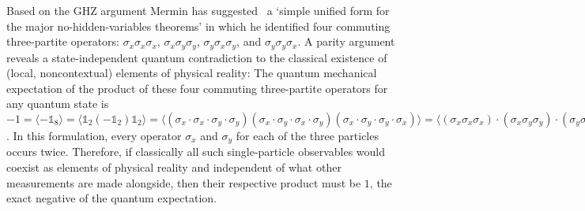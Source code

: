 \documentclass[
  twocolumn,
 showpacs,
 showkeys,
 preprintnumbers,
 amsmath,amssymb,
 aps,
 pra,
  longbibliography,
 floatfix,
 ]{revtex4-2}
\newcommand\myotimes{ }
\begin{document}
Based on the GHZ argument Mermin has suggested~\cite{mermin,mermin90b} a `simple unified form for the major no-hidden-variables theorems' in which he identified four commuting three-partite operators:
$\sigma_x \myotimes  \sigma_x \myotimes  \sigma_x$, $\sigma_x \myotimes  \sigma_y \myotimes  \sigma_y$, $\sigma_y \myotimes  \sigma_x \myotimes  \sigma_y$, and $\sigma_y \myotimes  \sigma_y \myotimes  \sigma_x$.
A parity argument reveals a state-independent quantum contradiction to the classical existence of (local, noncontextual) elements of physical reality:
The quantum mechanical expectation of the product of these four commuting three-partite operators for any quantum state is
$
-1= \langle
-\mathbb{1}_8
 \rangle
=
\langle
\mathbb{1}_2
\myotimes
(
-\mathbb{1}_2
)
\myotimes
\mathbb{1}_2
 \rangle
=
\langle
(
\sigma_x  \cdot \sigma_x  \cdot \sigma_y   \cdot \sigma_y
)
\myotimes
(
\sigma_x   \cdot \sigma_y   \cdot \sigma_x   \cdot  \sigma_y
)
\myotimes
(
\sigma_x   \cdot \sigma_y    \cdot \sigma_y    \cdot \sigma_x
) \rangle
=
\langle  (\sigma_x \myotimes  \sigma_x \myotimes  \sigma_x) \cdot (\sigma_x \myotimes  \sigma_y \myotimes  \sigma_y) \cdot (\sigma_y \myotimes  \sigma_x \myotimes  \sigma_y) \cdot (\sigma_y \myotimes  \sigma_y \myotimes  \sigma_x) \rangle
=
\langle  \sigma_x \myotimes  \sigma_x \myotimes  \sigma_x  \rangle \langle \sigma_x \myotimes  \sigma_y \myotimes  \sigma_y  \rangle \langle
\sigma_y \myotimes  \sigma_x \myotimes  \sigma_y  \rangle \langle   \sigma_y \myotimes  \sigma_y \myotimes  \sigma_x \rangle
$.
In this formulation, every operator $\sigma_x$ and $\sigma_y$ for each of the three particles occurs twice. Therefore, if classically all such single-particle observables would coexist as elements of physical reality and independent of what other measurements are made alongside,
then their respective product must be $1$, the exact negative of the quantum expectation.
\end{document}
